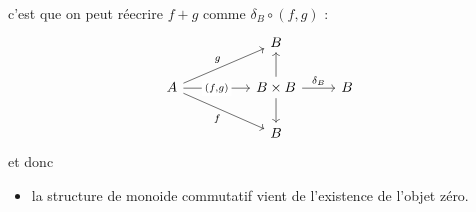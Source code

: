 \documentclass[a4paper,12pt]{book}
\theoremstyle{plain}
\theoremstyle{definition}
\theoremstyle{remark}
\begin{document}
c'est que on peut réecrire $f+g$ comme $\delta_B\circ (f,g)$ :
\[\begin{tikzcd}
	&& B \\
	A && {B\times B} & B \\
	&& B
	\arrow["g", from=2-1, to=1-3]
	\arrow["{(f,g)}"{description}, from=2-1, to=2-3]
	\arrow["f"', from=2-1, to=3-3]
	\arrow[from=2-3, to=1-3]
	\arrow["{\delta_B}", from=2-3, to=2-4]
	\arrow[from=2-3, to=3-3]
\end{tikzcd}\]
et donc 
\begin{itemize}
    \item la structure de monoide commutatif vient de l'existence de
l'objet zéro.
\end{itemize}


\end{document}
